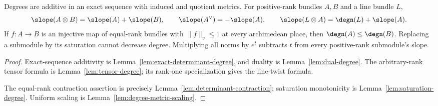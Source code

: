 \begin{lemma}
\label{lem:degree-calculus}
\leanok
Degrees are additive in an exact sequence with induced and quotient
metrics. For positive-rank bundles $A,B$ and a line bundle $L$,
\[
 \slope(A\otimes B)=\slope(A)+\slope(B),\qquad
 \slope(A^\vee)=-\slope(A),\qquad
 \slope(L\otimes A)=\degn(L)+\slope(A).
\]
If $f:A\to B$ is an injective map of equal-rank bundles with
$\|f\|_v\leq1$ at every archimedean place, then
$\degn(A)\leq\degn(B)$. Replacing a submodule by its saturation cannot
decrease degree. Multiplying all norms by $e^t$ subtracts $t$ from every
positive-rank submodule's slope.
\end{lemma}
\begin{proof}
Exact-sequence additivity is Lemma~\ref{lem:exact-determinant-degree},
and duality is Lemma~\ref{lem:dual-degree}. The arbitrary-rank tensor
formula is Lemma~\ref{lem:tensor-degree}; its rank-one specialization
gives the line-twist formula.

The equal-rank contraction assertion is precisely
Lemma~\ref{lem:determinant-contraction}; saturation monotonicity is
Lemma~\ref{lem:saturation-degree}. Uniform scaling is
Lemma~\ref{lem:degree-metric-scaling}.
\end{proof}

